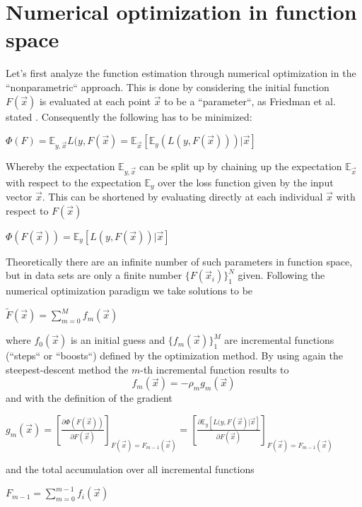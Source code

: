 \documentclass[12pt, a4paper]{article}
\begin{document}
\section{Numerical optimization in function space}
\label{sec: parameter_opt}
Let's first analyze the function estimation through numerical optimization in the ``nonparametric`` approach.
This is done by considering the initial function $F(\vec{x})$ is evaluated at each point $\vec{x}$ to be a ``parameter``, as Friedman et al. stated \cite{Friedman2001}. Consequently the following has to be minimized:
\begin{center}
    $\Phi(F) = \mathbb{E}_{y,\vec{x}} L(y,F(\vec{x}) = \mathbb{E}_{\vec{x}}[\mathbb{E}_y(L(y,F(\vec{x})))|\vec{x}]$
\end{center}
Whereby the expectation $\mathbb{E}_{y,\vec{x}}$ can be split up by chaining up the expectation $\mathbb{E}_{\vec{x}}$ with respect to the expectation $\mathbb{E}_y$ over the loss function given by the input vector $\vec{x}$. This can be shortened by evaluating directly at each individual $\vec{x}$ with respect to $F(\vec{x})$
\begin{center}
    $\Phi(F(\vec{x})) = \mathbb{E}_y [L(y,F(\vec{x}))|\vec{x}]$
\end{center}
Theoretically there are an infinite number of such parameters in function space, but in data sets are only a finite number $\{F(\vec{x}_i)\}_1^N$ given. Following the numerical optimization paradigm we take solutions to be 
\begin{center}
    $\tilde{F}(\vec{x}) = \sum_{m=0}^{M} f_m(\vec{x})$
\end{center}
where $f_0(\vec{x})$ is an initial guess and $\{f_m(\vec{x})\}_1^M$ are incremental functions (``steps`` or ``boosts``) defined by the optimization method. By using again the steepest-descent method the $m$-th incremental function results to
\begin{equation}
    \label{eq: incr_function}
    f_m(\vec{x}) = - \rho_m g_m(\vec{x})
\end{equation}
and with the definition of the gradient 
\begin{center}
    $g_m(\vec{x}) = [\frac{\partial \Phi(F(\vec{x}))}{\partial F(\vec{x})}]_{F(\vec{x}) = F_{m-1}(\vec{x})} = [\frac{\partial \mathbb{E}_y [L(y,F(\vec{x})|\vec{x}]}{\partial F(\vec{x})}]_{F(\vec{x}) = F_{m-1}(\vec{x})}$  
\end{center} 
and the total accumulation over all incremental functions 
\begin{center}    
    $F_{m-1} = \sum_{m=0}^{m-1} f_i(\vec{x})$
\end{center}
\end{document}
